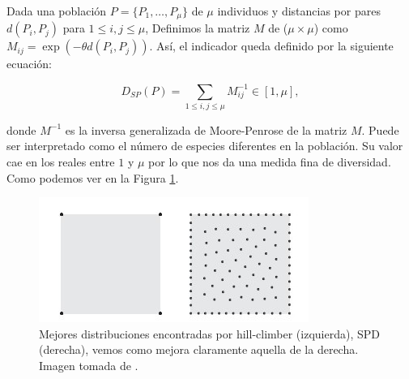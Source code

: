 Dada una población $P = \{P_1, \ldots, P_\mu\}$ de $\mu$ individuos y distancias por pares $d(P_i, P_j)$ para $1 \leq i,j \leq \mu$, Definimos la matriz $M$ de ($\mu \times \mu$) como $M_{ij} = \exp(-\theta  d(P_i, P_j))$. Así, el indicador queda definido por la siguiente ecuación:

\begin{equation} \label{eq:SPD}
    D_{SP}(P) = \sum_{1 \leq i,j \leq \mu} M_{ij}^{-1} \in [1, \mu], \nonumber
\end{equation}


donde $M^{-1}$ es la inversa generalizada de Moore-Penrose de la matriz $M$. Puede ser interpretado como el número de especies diferentes en la población. Su valor cae en los reales entre $1$ y $\mu$ por lo que nos da una medida fina de diversidad. Como podemos ver en la Figura \ref{fig:SPD}.

\begin{figure}[H]
    \centering
    \includegraphics[scale=1]{Figuras/SPD.jpg}
    \caption[SPD]{Mejores distribuciones encontradas por hill-climber (izquierda), SPD (derecha), vemos como mejora claramente aquella de la derecha. Imagen tomada  de \cite{SPD}.}
    \label{fig:SPD}
\end{figure}



